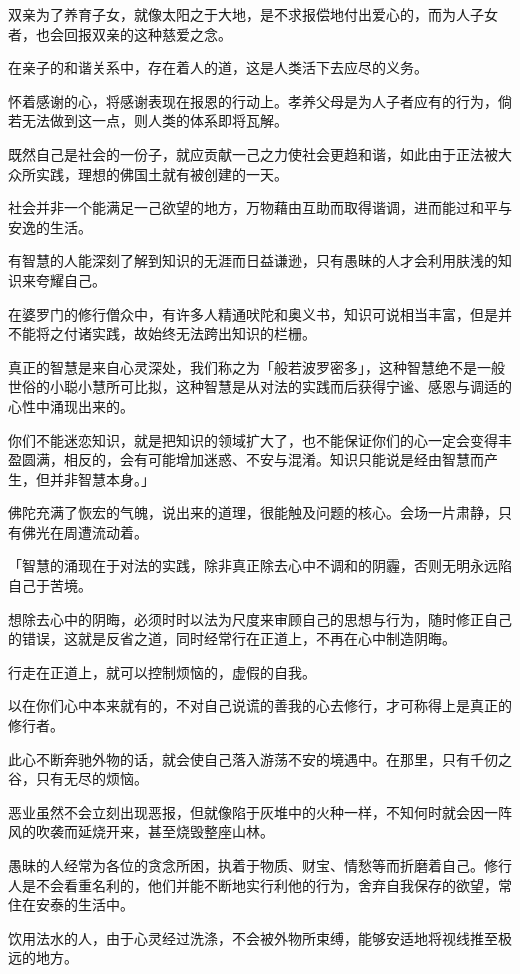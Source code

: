 \documentclass[twoside,openany]{book}
\begin{document}
双亲为了养育子女，就像太阳之于大地，是不求报偿地付出爱心的，而为人子女者，也会回报双亲的这种慈爱之念。

在亲子的和谐关系中，存在着人的道，这是人类活下去应尽的义务。

怀着感谢的心，将感谢表现在报恩的行动上。孝养父母是为人子者应有的行为，倘若无法做到这一点，则人类的体系即将瓦解。

既然自己是社会的一份子，就应贡献一己之力使社会更趋和谐，如此由于正法被大众所实践，理想的佛国土就有被创建的一天。

社会并非一个能满足一己欲望的地方，万物藉由互助而取得谐调，进而能过和平与安逸的生活。

有智慧的人能深刻了解到知识的无涯而日益谦逊，只有愚昧的人才会利用肤浅的知识来夸耀自己。

在婆罗门的修行僧众中，有许多人精通吠陀和奥义书，知识可说相当丰富，但是并不能将之付诸实践，故始终无法跨出知识的栏栅。

真正的智慧是来自心灵深处，我们称之为「般若波罗密多」，这种智慧绝不是一般世俗的小聪小慧所可比拟，这种智慧是从对法的实践而后获得宁谧、感恩与调适的心性中涌现出来的。

你们不能迷恋知识，就是把知识的领域扩大了，也不能保证你们的心一定会变得丰盈圆满，相反的，会有可能增加迷惑、不安与混淆。知识只能说是经由智慧而产生，但并非智慧本身。」

佛陀充满了恢宏的气魄，说出来的道理，很能触及问题的核心。会场一片肃静，只有佛光在周遭流动着。

「智慧的涌现在于对法的实践，除非真正除去心中不调和的阴霾，否则无明永远陷自己于苦境。

想除去心中的阴晦，必须时时以法为尺度来审顾自己的思想与行为，随时修正自己的错误，这就是反省之道，同时经常行在正道上，不再在心中制造阴晦。

行走在正道上，就可以控制烦恼的，虚假的自我。

以在你们心中本来就有的，不对自己说谎的善我的心去修行，才可称得上是真正的修行者。

此心不断奔驰外物的话，就会使自己落入游荡不安的境遇中。在那里，只有千仞之谷，只有无尽的烦恼。

恶业虽然不会立刻出现恶报，但就像陷于灰堆中的火种一样，不知何时就会因一阵风的吹袭而延烧开来，甚至烧毁整座山林。

愚昧的人经常为各位的贪念所困，执着于物质、财宝、情愁等而折磨着自己。修行人是不会看重名利的，他们并能不断地实行利他的行为，舍弃自我保存的欲望，常住在安泰的生活中。

饮用法水的人，由于心灵经过洗涤，不会被外物所束缚，能够安适地将视线推至极远的地方。
\end{document}
